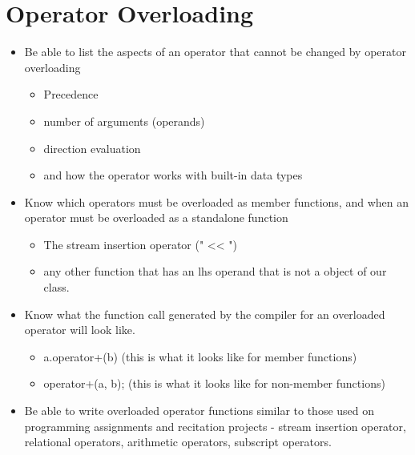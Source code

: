 \documentclass{report}
\begin{document}
    \section{Operator Overloading}
    \begin{itemize}
      \item Be able to list the aspects of an operator that cannot be changed by operator overloading
        \begin{itemize}[label=$\circ$]
          \item Precedence
          \item number of arguments (operands)
          \item direction evaluation
          \item and how the operator works with built-in data types
        \end{itemize}
      \item Know which operators must be overloaded as member functions, and when an operator must be overloaded as a standalone function
        \begin{itemize}[label=$\circ$]
          \item The stream insertion operator (" << ")
          \item any other function that has an lhs operand that is not a object of our class.
        \end{itemize}
      \item Know what the function call generated by the compiler for an overloaded operator will look like.
        \begin{itemize}[label=$\circ$]
          \item a.operator+(b) (this is what it looks like for member functions)
          \item operator+(a, b); (this is what it looks like for non-member functions)
        \end{itemize}
      \item Be able to write overloaded operator functions similar to those used on programming assignments and recitation projects - stream insertion operator, relational operators, arithmetic operators, subscript operators.
    \end{itemize}
\end{document}
